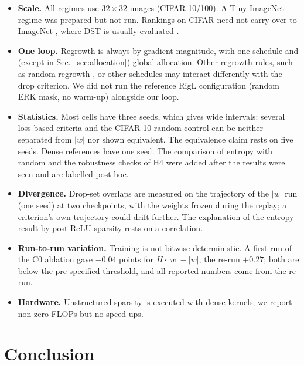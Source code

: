 \begin{itemize}
    \item \textbf{Scale.} All regimes use $32\times32$ images (CIFAR-10/100). A Tiny ImageNet regime was prepared but not run. Rankings on CIFAR need not carry over to ImageNet \cite{deng2009imagenet}, where DST is usually evaluated \cite{evci2020rigging}.
    \item \textbf{One loop.} Regrowth is always by gradient magnitude, with one schedule and (except in Sec.~\ref{sec:allocation}) global allocation. Other regrowth rules, such as random regrowth \cite{mocanu2018scalable}, or other schedules may interact differently with the drop criterion. We did not run the reference RigL configuration (random ERK mask, no warm-up) alongside our loop.
    \item \textbf{Statistics.} Most cells have three seeds, which gives wide intervals: several loss-based criteria and the CIFAR-10 random control can be neither separated from $|w|$ nor shown equivalent. The equivalence claim rests on five seeds. Dense references have one seed. The comparison of entropy with random and the robustness checks of H4 were added after the results were seen and are labelled post hoc.
    \item \textbf{Divergence.} Drop-set overlaps are measured on the trajectory of the $|w|$ run (one seed) at two checkpoints, with the weights frozen during the replay; a criterion's own trajectory could drift further. The explanation of the entropy result by post-ReLU sparsity rests on a correlation.
    \item \textbf{Run-to-run variation.} Training is not bitwise deterministic. A first run of the C0 ablation gave $-0.04$ points for $H\cdot|w|-|w|$, the re-run $+0.27$; both are below the pre-specified threshold, and all reported numbers come from the re-run.
    \item \textbf{Hardware.} Unstructured sparsity is executed with dense kernels; we report non-zero FLOPs but no speed-ups.
\end{itemize}

\section{Conclusion}
\label{sec:conclusion}


